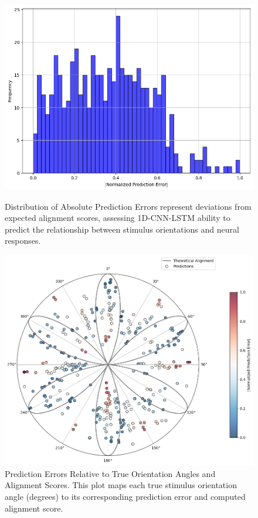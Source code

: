 \documentclass[a4paper]{article}
\begin{document}
\begin{figure}[htbp]
    \centering
    \begin{minipage}{0.43\textwidth}
        \centering
        \includegraphics[width=\linewidth]{lstmhistogram.png} 
        \caption{Distribution of Absolute Prediction Errors  represent deviations from expected alignment scores, assessing 1D-CNN-LSTM ability to predict the relationship between stimulus orientations and neural responses.}
        \label{fig:APErrors CNNLSTM}
    \end{minipage}\hfill
    \begin{minipage}{0.53\textwidth}
        \centering
        \includegraphics[width=\linewidth] {1d-cnn-lstm-model.png}
        \caption{Prediction Errors Relative to True Orientation Angles and Alignment Scores. This plot maps each true stimulus orientation angle (degrees) to its corresponding prediction error and computed alignment score.}
        \label{fig:PredictHybrid}
    \end{minipage}
\end{figure}
\end{document}

